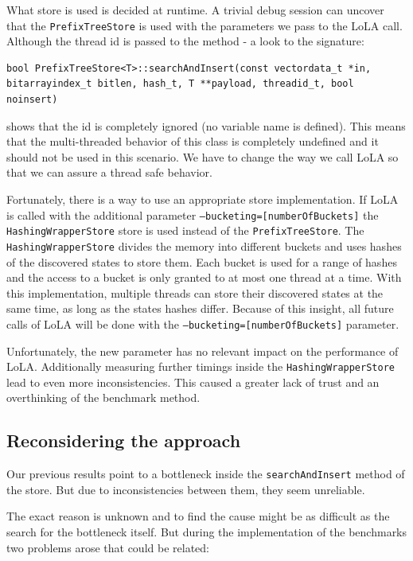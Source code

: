 What store is used is decided at runtime. A trivial debug session can uncover that the \texttt{PrefixTreeStore} is used with the parameters we pass to the LoLA call. Although the thread id is passed to the method - a look to the signature:
\begin{lstlisting}
bool PrefixTreeStore<T>::searchAndInsert(const vectordata_t *in, bitarrayindex_t bitlen, hash_t, T **payload, threadid_t, bool noinsert)
\end{lstlisting}
shows that the id is completely ignored (no variable name is defined). This means that the multi-threaded behavior of this class is completely undefined and it should not be used in this scenario. We have to change the way we call LoLA so that we can assure a thread safe behavior.

Fortunately, there is a way to use an appropriate store implementation. If LoLA is called with the additional parameter \texttt{--bucketing=[numberOfBuckets]} the \texttt{Hashing\-Wrapper\-Store} store is used instead of the \texttt{PrefixTreeStore}. The \texttt{Hashing\-Wrapper\-Store} divides the memory into different buckets and uses hashes of the discovered states to store them. Each bucket is used for a range of hashes and the access to a bucket is only granted to at most one thread at a time. With this implementation, multiple threads can store their discovered states at the same time, as long as the states hashes differ. Because of this insight, all future calls of LoLA will be done with the \texttt{--bucketing=[numberOfBuckets]} parameter.

Unfortunately, the new parameter has no relevant impact on the performance of LoLA. Additionally measuring further timings inside the \texttt{Hashing\-Wrapper\-Store} lead to even more inconsistencies. This caused a greater lack of trust and an overthinking of the benchmark method.

\subsection{Reconsidering the approach}
Our previous results point to a bottleneck inside the \texttt{searchAndInsert} method of the store. But due to inconsistencies between them, they seem unreliable.

The exact reason is unknown and to find the cause might be as difficult as the search for the bottleneck itself. But during the implementation of the benchmarks two problems arose that could be related:

